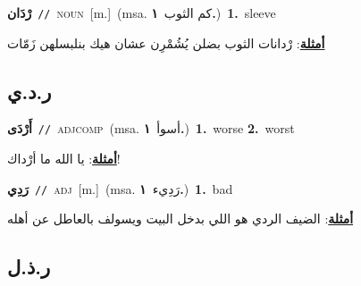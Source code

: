 \documentclass[10pt,a4paper,twoside]{article} %
\begin{document}
\begin{multicols}{2}
{\setlength\topsep{0pt}\textbf{\foreignlanguage{arabic}{رْدَان}}\ {\color{gray}\texttt{//}\color{black}}\ \textsc{noun}\ [m.]\ \color{gray}(msa. \foreignlanguage{arabic}{كم الثوب}~\foreignlanguage{arabic}{\textbf{١.}})\color{black}\ \textbf{1.}~sleeve\  \begin{flushright}\color{gray}\foreignlanguage{arabic}{\textbf{\underline{\foreignlanguage{arabic}{أمثلة}}}: رْدانات الثوب بضلن يُشُمْرِن عشان هيك بنلبسلهن زَمّات}\end{flushright}\color{black}} \vspace{2mm}

\vspace{-3mm}
\subsection*{\color{blue}\foreignlanguage{arabic}{ر.د.ي}\color{blue}{}} 

{\setlength\topsep{0pt}\textbf{\foreignlanguage{arabic}{أَرْدَى}}\ {\color{gray}\texttt{//}\color{black}}\ \textsc{adj\textunderscore comp}\ \color{gray}(msa. \foreignlanguage{arabic}{أسوأ}~\foreignlanguage{arabic}{\textbf{١.}})\color{black}\ \textbf{1.}~worse  \textbf{2.}~worst\  \begin{flushright}\color{gray}\foreignlanguage{arabic}{\textbf{\underline{\foreignlanguage{arabic}{أمثلة}}}: يا الله ما أرْداك!}\end{flushright}\color{black}} \vspace{2mm}

{\setlength\topsep{0pt}\textbf{\foreignlanguage{arabic}{رَدِي}}\ {\color{gray}\texttt{//}\color{black}}\ \textsc{adj}\ [m.]\ \color{gray}(msa. \foreignlanguage{arabic}{رَدِيء}~\foreignlanguage{arabic}{\textbf{١.}})\color{black}\ \textbf{1.}~bad\  \begin{flushright}\color{gray}\foreignlanguage{arabic}{\textbf{\underline{\foreignlanguage{arabic}{أمثلة}}}: الضيف الردي هو اللي بدخل البيت ويسولف بالعاطل عن أهله}\end{flushright}\color{black}} \vspace{2mm}

\vspace{-3mm}
\subsection*{\color{blue}\foreignlanguage{arabic}{ر.ذ.ل}\color{blue}{}} 


\end{multicols}
\end{document}
